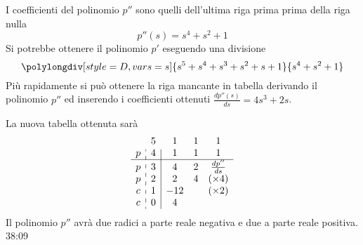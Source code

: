 I coefficienti del polinomio $p''$ sono quelli dell'ultima riga prima prima
della riga nulla
$$
p''(s) = s^4 + s^2 + 1
$$
Si potrebbe ottenere il polinomio $p'$ eseguendo una divisione
$$
\polylongdiv[style=D,vars=s]{s^5+s^4+s^3+s^2+s+1}{s^4+s^2+1}
$$
Più rapidamente si può ottenere la riga mancante in tabella derivando il
polinomio $p''$ ed inserendo i coefficienti ottenuti $\frac{dp''(s)}{ds} = 4s^3
+ 2s$.

La nuova tabella ottenuta sarà
$$
\begin{array}{c:c|ccc}
  & 5 & 1 & 1 & 1 \\
p & 4 & 1 & 1 & 1 \\ \hline
p & 3 & 4 & 2 & \frac{dp''}{ds}\\
p & 2 & 2 & 4 &(\times 4)\\
c & 1 & -12 & & (\times2)\\
c & 0 & 4
\end{array}
$$
Il polinomio $p''$ avrà due radici a parte reale negativa e due a parte
reale positiva.
38:09
